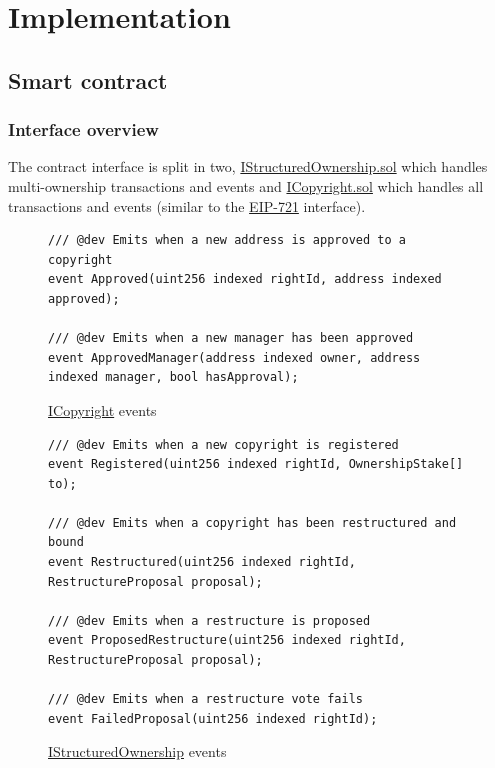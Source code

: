 \section{Implementation}

\subsection{Smart contract}

\subsubsection{Interface overview}

The contract interface is split in two, \href{https://github.com/MrHarrisonBarker/CRPL/blob/main/CRPL.Contracts/contracts/IStructuredOwnership.sol}{IStructuredOwnership.sol} which handles multi-ownership transactions and events and \href{https://github.com/MrHarrisonBarker/CRPL/blob/main/CRPL.Contracts/contracts/ICopyright.sol}{ICopyright.sol} which handles all  transactions and events (similar to the \href{https://eips.ethereum.org/EIPS/eip-721}{EIP-721} interface).

\begin{figure}[H]
\caption{\href{https://github.com/MrHarrisonBarker/CRPL/blob/main/CRPL.Contracts/contracts/ICopyright.sol}{ICopyright} events}
\begin{lstlisting}[language=Solidity]
/// @dev Emits when a new address is approved to a copyright
event Approved(uint256 indexed rightId, address indexed approved);

/// @dev Emits when a new manager has been approved
event ApprovedManager(address indexed owner, address indexed manager, bool hasApproval);
\end{lstlisting}
\end{figure}

\begin{figure}[H]
\caption{\href{https://github.com/MrHarrisonBarker/CRPL/blob/main/CRPL.Contracts/contracts/IStructuredOwnership.sol}{IStructuredOwnership} events}
\centering
\begin{lstlisting}[language=Solidity]
/// @dev Emits when a new copyright is registered
event Registered(uint256 indexed rightId, OwnershipStake[] to);

/// @dev Emits when a copyright has been restructured and bound
event Restructured(uint256 indexed rightId, RestructureProposal proposal);

/// @dev Emits when a restructure is proposed
event ProposedRestructure(uint256 indexed rightId, RestructureProposal proposal);

/// @dev Emits when a restructure vote fails
event FailedProposal(uint256 indexed rightId);
\end{lstlisting}
\end{figure}


